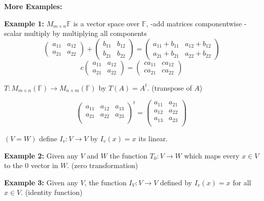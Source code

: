 \documentclass[12pt]{article}
\newcommand{\mF}{{\mathbb{F}}}
\begin{document}
		{\color{Brown}
			\textbf{More Examples: }

			\textbf{Example 1:}
			$M_{m\times n} \mF$ is a vector space over $\mF$, 
			-add matrices componentwise
			-scalar multiply by multiplying all components
			\[
				\begin{pmatrix}
					a_{11} & a_{12} \\ 
					a_{21} & a_{22}
				\end{pmatrix}
				+
				\begin{pmatrix}
					b_{11} & b_{12} \\
					b_{21} & b_{22}
				\end{pmatrix}
				= 
				\begin{pmatrix}
					a_{11} + b_{11} & a_{12} + b_{12}\\
					a_{21} + b_{21} & a_{22} + b_{22}
				\end{pmatrix}
			\]
			\[
				c \begin{pmatrix}
					a_{11} & a_{12} \\
					a_{21} & a_{22}
				\end{pmatrix}
				 = \begin{pmatrix}
				 	 ca_{11} & ca_{12}\\
				 	 ca_{21} & ca_{22}
				 \end{pmatrix}
			\]

			$T:M_{m\times n} (\mF) \to M_{n\times m} (\mF)$ by $T(A) = A^t$.
			(transpose of $A$)

			\[
				\begin{pmatrix}
					a_{11} & a_{12} & a_{13}\\
					a_{21} & a_{22} & a_{23}\\
				\end{pmatrix}^t
				=
				\begin{pmatrix}
					a_{11} & a_{21}\\
					a_{12} & a_{22}\\
					a_{13} & a_{23}\\
				\end{pmatrix}
			\]

			$(V=W)$ define $I_v : V\to V$ by $I_v(x) = x$ its linear.
		
		\textbf{Example 2:}
		Given any $V$ and $W$ the function $T_0 : V\to W$ which maps every 
		$x \in V$ to the $0$ vector in $W$. (zero transformation)

		\textbf{Example 3:}
		Given any $V$, the function $I_V : V \to V$ defined by $I_v (x) = x$
		for all $x \in V$. (identity function)
		}
\end{document}

